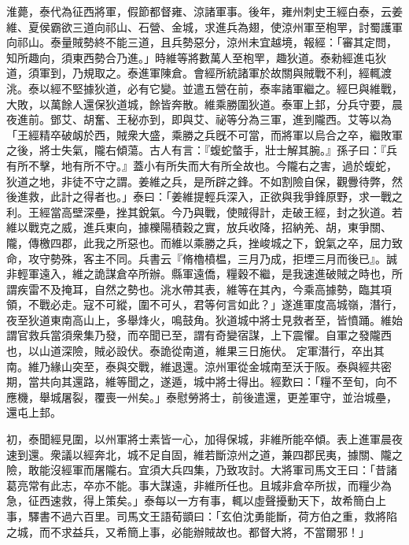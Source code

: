 \begin{pinyinscope}
 
淮薨，泰代為征西將軍，假節都督雍、涼諸軍事。後年，雍州刺史王經白泰，云姜維、夏侯霸欲三道向祁山、石營、金城，求進兵為翅，使涼州軍至枹䍐，討蜀護軍向祁山。泰量賊勢終不能三道，且兵勢惡分，涼州未宜越境，報經：「審其定問，知所趣向，須東西勢合乃進。」時維等將數萬人至枹䍐，趣狄道。泰勑經進屯狄道，須軍到，乃規取之。泰進軍陳倉。會經所統諸軍於故關與賊戰不利，經輒渡洮。泰以經不堅據狄道，必有它變。並遣五營在前，泰率諸軍繼之。經巳與維戰，大敗，以萬餘人還保狄道城，餘皆奔散。維乘勝圍狄道。泰軍上邽，分兵守要，晨夜進前。鄧艾、胡奮、王秘亦到，即與艾、祕等分為三軍，進到隴西。艾等以為「王經精卒破衂於西，賊衆大盛，乘勝之兵旣不可當，而將軍以烏合之卒，繼敗軍之後，將士失氣，隴右傾蕩。古人有言：『蝮蛇螫手，壯士解其腕。』孫子曰：『兵有所不擊，地有所不守。』蓋小有所失而大有所全故也。今隴右之害，過於蝮蛇，狄道之地，非徒不守之謂。姜維之兵，是所辟之鋒。不如割險自保，觀釁待弊，然後進救，此計之得者也。」泰曰：「姜維提輕兵深入，正欲與我爭鋒原野，求一戰之利。王經當高壁深壘，挫其銳氣。今乃與戰，使賊得計，走破王經，封之狄道。若維以戰克之威，進兵東向，據櫟陽積穀之實，放兵收降，招納羌、胡，東爭關、隴，傳檄四郡，此我之所惡也。而維以乘勝之兵，挫峻城之下，銳氣之卒，屈力致命，攻守勢殊，客主不同。兵書云『脩櫓橨榅，三月乃成，拒堙三月而後已』。誠非輕軍遠入，維之詭謀倉卒所辦。縣軍遠僑，糧穀不繼，是我速進破賊之時也，所謂疾雷不及掩耳，自然之勢也。洮水帶其表，維等在其內，今乘高據勢，臨其項領，不戰必走。寇不可縱，圍不可乆，君等何言如此？」遂進軍度高城嶺，潛行，夜至狄道東南高山上，多舉烽火，鳴鼓角。狄道城中將士見救者至，皆憤踊。維始謂官救兵當須衆集乃發，而卒聞已至，謂有奇變宿謀，上下震懼。自軍之發隴西也，以山道深險，賊必設伏。泰詭從南道，維果三日施伏。
 定軍潛行，卒出其南。維乃緣山突至，泰與交戰，維退還。涼州軍從金城南至沃于阪。泰與經共密期，當共向其還路，維等聞之，遂遁，城中將士得出。經歎曰：「糧不至旬，向不應機，舉城屠裂，覆喪一州矣。」泰慰勞將士，前後遣還，更差軍守，並治城壘，還屯上邽。
 
 
 
 
 初，泰聞經見圍，以州軍將士素皆一心，加得保城，非維所能卒傾。表上進軍晨夜速到還。衆議以經奔北，城不足自固，維若斷涼州之道，兼四郡民夷，據關、隴之險，敢能沒經軍而屠隴右。宜須大兵四集，乃致攻討。大將軍司馬文王曰：「昔諸葛亮常有此志，卒亦不能。事大謀遠，非維所任也。且城非倉卒所拔，而糧少為急，征西速救，得上策矣。」泰每以一方有事，輒以虛聲擾動天下，故希簡白上事，驛書不過六百里。司馬文王語荀顗曰：「玄伯沈勇能斷，荷方伯之重，救將陷之城，而不求益兵，又希簡上事，必能辦賊故也。都督大將，不當爾邪！」
 

\end{pinyinscope}
